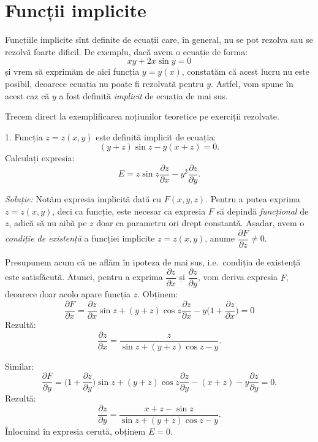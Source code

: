 
\chapter{Funcții implicite}


Funcțiile implicite sînt definite de ecuații care, în general, nu se pot
rezolva sau se rezolvă foarte dificil. De exemplu, dacă avem o ecuație
de forma:
\[
  xy + 2x\sin y = 0
\]
și vrem să exprimăm de aici funcția $ y = y(x) $, constatăm că acest
lucru nu este posibil, deoarece ecuația nu poate fi rezolvată pentru $ y $.
Astfel, vom spune în acest caz că $ y $ a fost definită \emph{implicit}
de ecuația de mai sus.

Trecem direct la exemplificarea noțiunilor teoretice pe exerciții rezolvate.

\vspace{0.5cm}

1. Funcția $ z = z(x, y) $ este definită implicit de ecuația:
\[
  (y + z) \sin z - y (x + z) = 0.
\]
Calculați expresia:
\[
  E = z \sin z \frac{\partial z}{\partial x} - y^2 \frac{\partial z}{\partial y}.
\]

\emph{Soluție:} Notăm expresia implicită dată cu $ F(x, y, z) $. Pentru a putea
exprima $ z = z(x, y) $, deci ca funcție, este necesar ca expresia $ F $ să depindă
\emph{funcțional} de $ z $, adică să nu aibă pe $ z $ doar ca parametru ori drept
constantă. Așadar, avem o \emph{condiție de existență} a funcției implicite
$ z = z(x, y) $, anume $ \dfrac{\partial F}{\partial z} \neq 0 $.

Presupunem acum că ne aflăm în ipoteza de mai sus, i.e.\ condiția de existență
este satisfăcută. Atunci, pentru a exprima $ \dfrac{\partial z}{\partial x} $
și $ \dfrac{\partial z}{\partial y} $, vom deriva expresia $ F $, deoarece
doar acolo apare funcția $ z $. Obținem:
\[
  \frac{\partial F}{\partial x} = \frac{\partial z}{\partial x} \sin z + %
  (y + z) \cos z \dfrac{\partial z}{\partial x} - %
  y\Big(1 + \dfrac{\partial z}{\partial x} \Big) = 0
\]
Rezultă:
\[
  \frac{\partial z}{\partial x} = \frac{z}{\sin z + (y + z) \cos z - y}.
\]

Similar:
\[
  \frac{\partial F}{\partial y} = \Big(1 + \frac{\partial z}{\partial y} \Big) \sin z + %
  (y + z) \cos z \frac{\partial z}{\partial y} - (x + z) - y \frac{\partial z}{\partial y} = 0.
\]
Rezultă:
\[
  \frac{\partial z}{\partial y} = \dfrac{x + z - \sin z}{\sin z + (y + z)\cos z - y}.
\]
Înlocuind în expresia cerută, obținem $ E = 0 $.

